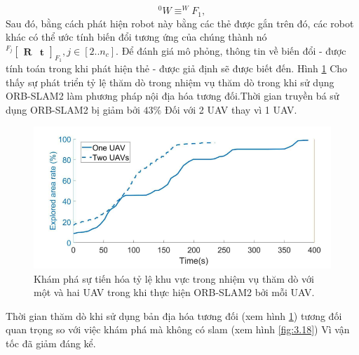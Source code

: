 \documentclass[11pt,openany]{book}
\begin{document}
\begin{algorimth}[H]
\begin{equation}\label{eq:3.9}
    ^0W\equiv ^WF_1,
\end{equation}
Sau đó, bằng cách phát hiện robot này bằng các thẻ được gắn trên đó, các robot khác có thể ước tính biến đổi tương ứng của chúng thành nó $^{F_j}\begin{bmatrix}\mathbf{R} & \mathbf{t}\end{bmatrix}_{F_1}, j \in [2..n_c]$. Để đánh giá mô phỏng, thông tin về biến đổi - được tính toán trong khi phát hiện thẻ - được giả định sẽ được biết đến. Hình \ref{fig:3.24} Cho thấy sự phát triển tỷ lệ thăm dò trong nhiệm vụ thăm dò trong khi sử dụng ORB-SLAM2 làm phương pháp nội địa hóa tương đối.Thời gian truyền bá sử dụng ORB-SLAM2 bị giảm bởi $43\%$ Đối với 2 UAV thay vì 1 UAV.
\begin{figure}[H]
    \centering
    \includegraphics[tỉ lệ=0.4]{assets/3_24.png}
    \caption{Khám phá sự tiến hóa tỷ lệ khu vực trong nhiệm vụ thăm dò với một và hai UAV trong khi thực hiện ORB-SLAM2 bởi mỗi UAV.}
    \label{fig:3.24}
\end{figure}
Thời gian thăm dò khi sử dụng bản địa hóa tương đối (xem hình \ref{fig:3.24}) tương đối quan trọng so với việc khám phá mà không có slam (xem hình \ref{fig:3.18}) Vì vận tốc đã giảm đáng kể.

\end{algorimth}
\end{document}
